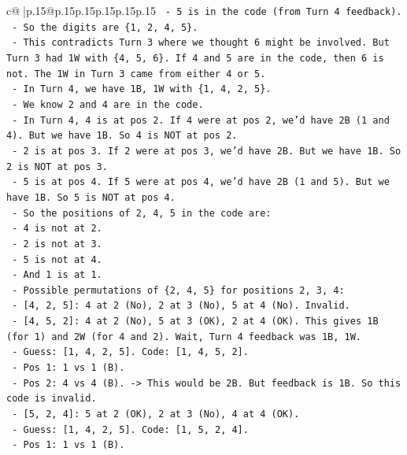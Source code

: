 \documentclass{article}
\begin{document}
{\begin{supertabular}{c@{$\;$}|p{.15\linewidth}@{}p{.15\linewidth}p{.15\linewidth}p{.15\linewidth}p{.15\linewidth}p{.15\linewidth}}
{{{\texttt{    {-} 5 is in the code (from Turn 4 feedback).} \\
\texttt{    {-} So the digits are \{1, 2, 4, 5\}.} \\
\texttt{    {-} This contradicts Turn 3 where we thought 6 might be involved. But Turn 3 had 1W with \{4, 5, 6\}. If 4 and 5 are in the code, then 6 is not. The 1W in Turn 3 came from either 4 or 5.} \\
\texttt{    {-} In Turn 4, we have 1B, 1W with \{1, 4, 2, 5\}.} \\
\texttt{    {-} We know 2 and 4 are in the code.} \\
\texttt{    {-} In Turn 4, 4 is at pos 2. If 4 were at pos 2, we'd have 2B (1 and 4). But we have 1B. So 4 is NOT at pos 2.} \\
\texttt{    {-} 2 is at pos 3. If 2 were at pos 3, we'd have 2B. But we have 1B. So 2 is NOT at pos 3.} \\
\texttt{    {-} 5 is at pos 4. If 5 were at pos 4, we'd have 2B (1 and 5). But we have 1B. So 5 is NOT at pos 4.} \\
\texttt{    {-} So the positions of 2, 4, 5 in the code are:} \\
\texttt{      {-} 4 is not at 2.} \\
\texttt{      {-} 2 is not at 3.} \\
\texttt{      {-} 5 is not at 4.} \\
\texttt{    {-} And 1 is at 1.} \\
\texttt{    {-} Possible permutations of \{2, 4, 5\} for positions 2, 3, 4:} \\
\texttt{      {-} {[}4, 2, 5{]}: 4 at 2 (No), 2 at 3 (No), 5 at 4 (No). Invalid.} \\
\texttt{      {-} {[}4, 5, 2{]}: 4 at 2 (No), 5 at 3 (OK), 2 at 4 (OK). This gives 1B (for 1) and 2W (for 4 and 2). Wait, Turn 4 feedback was 1B, 1W.} \\
\texttt{        {-} Guess: {[}1, 4, 2, 5{]}. Code: {[}1, 4, 5, 2{]}.} \\
\texttt{        {-} Pos 1: 1 vs 1 (B).} \\
\texttt{        {-} Pos 2: 4 vs 4 (B). {-}> This would be 2B. But feedback is 1B. So this code is invalid.} \\
\texttt{      {-} {[}5, 2, 4{]}: 5 at 2 (OK), 2 at 3 (No), 4 at 4 (OK).} \\
\texttt{        {-} Guess: {[}1, 4, 2, 5{]}. Code: {[}1, 5, 2, 4{]}.} \\
\texttt{        {-} Pos 1: 1 vs 1 (B).} \\
}}}
\end{supertabular}}
\end{document}
